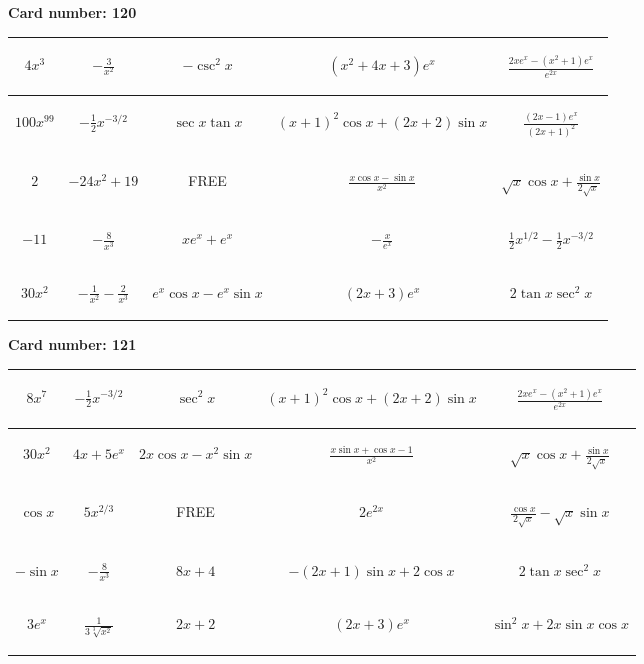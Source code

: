 \documentclass{article}
\newcommand{\entry}[1]{\begin{minipage}[t][2.75cm][t]{4cm} \vspace{1cm} \begin{center}#1\end{center} \end{minipage}}
\newcommand{\freespace}{\entry{FREE}}
\newcommand{\cardnumber}[1]{\noindent \textbf{Card number: #1} \bigskip}
\begin{document}
\pagebreak

\cardnumber{120}
\begin{center}
\begin{tabular}{|*{5}{c|}}
    \hline
    \entry{$4x^3$} & \entry{$-\frac{3}{x^2}$} & \entry{$-\csc^2 x$} & \entry{$(x^2 + 4x + 3) e^x$} & \entry{$\frac{2x e^x - (x^2 + 1) e^x}{e^{2x}}$} \\ \hline
    \entry{$100x^{99}$} & \entry{$-\frac{1}{2} x^{-3/2}$} & \entry{$\sec x \tan x$} & \entry{$(x + 1)^2 \cos x + (2x + 2) \sin x$} & \entry{$\frac{(2x - 1) e^x}{(2x + 1)^2}$} \\ \hline
    \entry{$2$} & \entry{$-24x^2 + 19$} & \freespace & \entry{$\frac{x \cos x - \sin x}{x^2}$} & \entry{$\sqrt{x} \cos x + \frac{\sin x}{2 \sqrt{x}}$} \\ \hline
    \entry{$-11$} & \entry{$-\frac{8}{x^3}$} & \entry{$x e^x + e^x$} & \entry{$-\frac{x}{e^x}$} & \entry{$\frac{1}{2} x^{1/2} - \frac{1}{2} x^{-3/2}$} \\ \hline
    \entry{$30x^2$} & \entry{$-\frac{1}{x^2} - \frac{2}{x^3}$} & \entry{$e^x \cos x - e^x \sin x$} & \entry{$(2x + 3) e^x$} & \entry{$2 \tan x \sec^2 x$} \\ \hline
\end{tabular}
\end{center}

\pagebreak

\cardnumber{121}
\begin{center}
\begin{tabular}{|*{5}{c|}}
    \hline
    \entry{$8x^7$} & \entry{$-\frac{1}{2} x^{-3/2}$} & \entry{$\sec^2 x$} & \entry{$(x + 1)^2 \cos x + (2x + 2) \sin x$} & \entry{$\frac{2x e^x - (x^2 + 1) e^x}{e^{2x}}$} \\ \hline
    \entry{$30x^2$} & \entry{$4x + 5e^x$} & \entry{$2x \cos x - x^2 \sin x$} & \entry{$\frac{x \sin x + \cos x - 1}{x^2}$} & \entry{$\sqrt{x} \cos x + \frac{\sin x}{2 \sqrt{x}}$} \\ \hline
    \entry{$\cos x$} & \entry{$5x^{2/3}$} & \freespace & \entry{$2e^{2x}$} & \entry{$\frac{\cos x}{2 \sqrt{x}} - \sqrt{x} \sin x$} \\ \hline
    \entry{$-\sin x$} & \entry{$-\frac{8}{x^3}$} & \entry{$8x + 4$} & \entry{$-(2x + 1) \sin x + 2 \cos x$} & \entry{$2 \tan x \sec^2 x$} \\ \hline
    \entry{$3e^x$} & \entry{$\frac{1}{3\sqrt[3]{x^2}}$} & \entry{$2x + 2$} & \entry{$(2x + 3) e^x$} & \entry{$\sin^2 x + 2x \sin x \cos x$} \\ \hline
\end{tabular}
\end{center}
\end{document}
